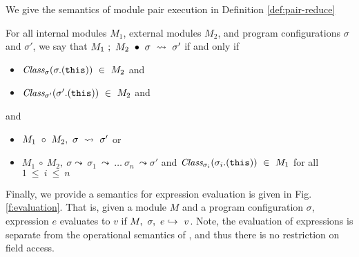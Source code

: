 We give the semantics of module pair execution in Definition \ref{def:pair-reduce}
\begin{definition}
\label{def:pair-reduce}
For all internal modules $M_1$, external modules $M_2$, and program configurations $\sigma$ and $\sigma'$, 
we say that $M_1\ ;\ M_2\ \bullet\ \sigma\ \leadsto\ \sigma'$ if and only if
\begin{itemize}
\item
$\class{\sigma}{\sigma.(\texttt{this})}\ \in\ M_2$ and
\item
$\class{\sigma'}{\sigma'.(\texttt{this})}\ \in\ M_2$ and 
\end{itemize} 
and
\begin{itemize}
\item
$\exec{M_1\ \circ\ M_2}{\sigma}{\sigma'}$ or
\item
$M_1\ \circ\ M_2,\ \sigma \leadsto\ \sigma_1\ \leadsto\ \ldots\ \sigma_n\ \leadsto \sigma'$ and $\class{\sigma_i}{\sigma_i.(\texttt{this})}\ \in\ M_1$ for all $1\ \leq\ i\ \leq\ n$
\end{itemize}
\end{definition}

Finally, we provide a semantics for expression evaluation is given in Fig. \ref{f:evaluation}. 
That is, given a module $M$ and a program configuration $\sigma$, expression $e$ evaluates to $v$
if $M,\ \sigma,\ e \hookrightarrow\ v$. Note, the evaluation of expressions is separate from the operational
semantics of \Loo, and thus there is no restriction on field access.